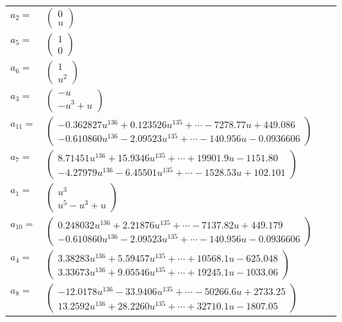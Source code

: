 \documentclass[1p]{elsarticle_modified}
\theoremstyle{definition}
\begin{document}
\begin{tabular}{m{7pt} m{180pt} m{7pt} m{180pt} }
\flushright $a_{2}=$&$\begin{pmatrix}0\\u\end{pmatrix}$ \\
\flushright $a_{5}=$&$\begin{pmatrix}1\\0\end{pmatrix}$ \\
\flushright $a_{6}=$&$\begin{pmatrix}1\\u^2\end{pmatrix}$ \\
\flushright $a_{3}=$&$\begin{pmatrix}- u\\- u^3+u\end{pmatrix}$ \\
\flushright $a_{11}=$&$\begin{pmatrix}-0.362827 u^{136}+0.123526 u^{135}+\cdots-7278.77 u+449.086\\-0.610860 u^{136}-2.09523 u^{135}+\cdots-140.956 u-0.0936606\end{pmatrix}$ \\
\flushright $a_{7}=$&$\begin{pmatrix}8.71451 u^{136}+15.9346 u^{135}+\cdots+19901.9 u-1151.80\\-4.27979 u^{136}-6.45501 u^{135}+\cdots-1528.53 u+102.101\end{pmatrix}$ \\
\flushright $a_{1}=$&$\begin{pmatrix}u^3\\u^5- u^3+u\end{pmatrix}$ \\
\flushright $a_{10}=$&$\begin{pmatrix}0.248032 u^{136}+2.21876 u^{135}+\cdots-7137.82 u+449.179\\-0.610860 u^{136}-2.09523 u^{135}+\cdots-140.956 u-0.0936606\end{pmatrix}$ \\
\flushright $a_{4}=$&$\begin{pmatrix}3.38283 u^{136}+5.59457 u^{135}+\cdots+10568.1 u-625.048\\3.33673 u^{136}+9.05546 u^{135}+\cdots+19245.1 u-1033.06\end{pmatrix}$ \\
\flushright $a_{8}=$&$\begin{pmatrix}-12.0178 u^{136}-33.9406 u^{135}+\cdots-50266.6 u+2733.25\\13.2592 u^{136}+28.2260 u^{135}+\cdots+32710.1 u-1807.05\end{pmatrix}$ \\

\end{tabular}
\end{document}
